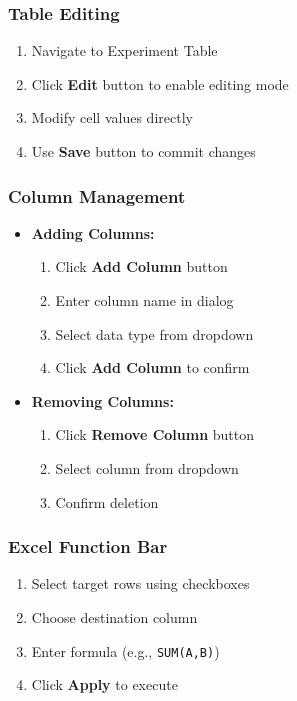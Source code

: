 \documentclass[12pt]{article}
\begin{document}
\subsubsection{Table Editing}
\begin{enumerate}
    \item Navigate to Experiment Table
    \item Click \textbf{Edit} button to enable editing mode
    \item Modify cell values directly
    \item Use \textbf{Save} button to commit changes
\end{enumerate}

\subsubsection{Column Management}
\begin{itemize}
    \item \textbf{Adding Columns:}
    \begin{enumerate}
        \item Click \textbf{Add Column} button
        \item Enter column name in dialog
        \item Select data type from dropdown
        \item Click \textbf{Add Column} to confirm
    \end{enumerate}
    
    \item \textbf{Removing Columns:}
    \begin{enumerate}
        \item Click \textbf{Remove Column} button
        \item Select column from dropdown
        \item Confirm deletion
    \end{enumerate}
\end{itemize}

\subsubsection{Excel Function Bar}
\begin{enumerate}
    \item Select target rows using checkboxes
    \item Choose destination column
    \item Enter formula (e.g., \texttt{SUM(A,B)})
    \item Click \textbf{Apply} to execute
\end{enumerate}
\end{document}
